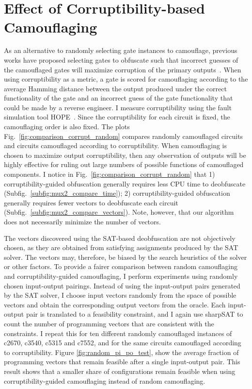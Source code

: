 \documentclass[proposal]{umassthesis}  %
\begin{document}
\section{Effect of Corruptibility-based Camouflaging}

As an alternative to randomly selecting gate instances to camouflage, previous works have proposed selecting gates to obfuscate such that incorrect guesses of the camouflaged gates will maximize corruption of the primary outputs~\cite{chakraborty-09,rajendran-13}. When using corruptibility as a metric, a gate is scored for camouflaging according to the average Hamming distance between the output produced under the correct functionality of the gate and an incorrect guess of the gate functionality that could be made by a reverse engineer. I measure corruptibility using the fault simulation tool HOPE~\cite{lee-96}. Since the corruptibility for each circuit is fixed, the camouflaging order is also fixed. The plots Fig.~\ref{fig:comparison_corrupt_random} compares randomly camouflaged circuits and circuits camouflaged according to corruptibility. When camouflaging is chosen to maximize output corruptibility, then any observation of outputs will be highly effective for ruling out large numbers of possible functions of camouflaged components. I notice in Fig.~\ref{fig:comparison_corrupt_random} that 1) corruptibility-guided obfuscation generally requires less CPU time to deobfuscate (Subfig.~\ref{subfig:mux2_compare_time}); 2) corruptibility-guided obfuscation generally requires fewer vectors to deobfuscate each circuit (Subfig.~\ref{subfig:mux2_compare_vectors}). Note, however, that our algorithm does not necessarily minimize the number of vectors.

{The vectors discovered using the SAT-based deobfuscation are not objectively chosen, as they are obtained from satisfying assignments produced by the SAT solver. The vectors may, therefore, be biased by the search heuristics of the solver or other factors. To provide a fairer comparison between random camouflaging and corruptibility-guided camouflaging, I perform experiments using randomly chosen input-output pairings. Instead of using the input-output pairs generated by the SAT solver, I choose input vectors randomly from the space of possible vectors and obtain the corresponding output vectors from the oracle. Each input-output pair is translated to a feasibility constraint, and I again use sharpSAT to count the number of programming vectors that are consistent with the constraints. I repeat this for ten different randomly camouflaged instances of c2670, c3540, c5315 and c7552, and for the same circuits camouflaged according to corruptibility. Figure \ref{fig:random_pi_po_test}, show the average fraction of programming vectors that remain feasible after a single input-output pair. This result shows that a smaller share of configurations remain feasible when using corruptibility-guided camouflaging instead of random camouflaging.}
\end{document}
